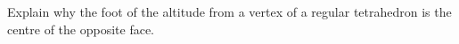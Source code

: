 Explain why the foot of the altitude from a vertex of a regular tetrahedron is the centre of the opposite face.
